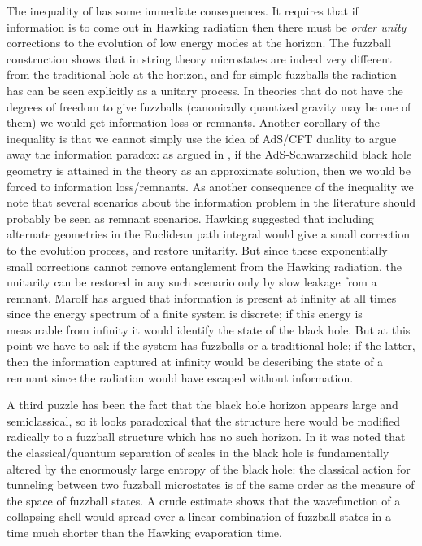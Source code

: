 \documentclass[12pt]{article}
\begin{document}
The inequality of \cite{mathurfuzz} has some immediate consequences. It requires that if information is to come out in Hawking radiation then there must be {\it order unity} corrections to the evolution of low energy modes at the horizon. The fuzzball construction shows that in string theory microstates are indeed very different from the traditional hole at the horizon, and for simple fuzzballs the radiation has can be seen explicitly as a unitary process. In theories that do not have the degrees of freedom to give fuzzballs (canonically quantized gravity may be one of them) we would get information loss or remnants. Another corollary of the inequality is that we cannot simply use the idea of AdS/CFT duality to argue away the information paradox: as argued in  \cite{mathurfuzz,mathurrecent}, if the AdS-Schwarzschild black hole geometry is attained in the theory as an approximate solution, then we would be forced to information loss/remnants. As another consequence of the inequality we note that several scenarios about the information problem in the literature should probably be seen as remnant scenarios. Hawking \cite{hawkingreverse} suggested that including alternate geometries in the Euclidean path integral would give a small correction to the evolution process, and restore unitarity. But since these exponentially small corrections cannot remove entanglement from the Hawking radiation, the unitarity can be restored in any such scenario only by slow leakage from a remnant. Marolf \cite{marolf} has argued that information is present at infinity at all times since the energy spectrum of a finite system is discrete; if  this energy is measurable from infinity it would identify the state of the black hole. But at this point we have to ask if the system has fuzzballs or a  traditional hole; if the latter,  then the information captured at infinity would be describing the state of a remnant since the radiation would have escaped without information. 


A third puzzle has been the fact that the black hole horizon appears large and semiclassical, so it looks paradoxical that the structure here would be modified radically to a fuzzball structure which has no such horizon. In \cite{tunnel} it was noted that the classical/quantum separation of scales in the black hole is fundamentally altered by  the enormously large entropy of the black hole: the classical action for tunneling between two fuzzball microstates is of the same order as the measure of the space of fuzzball states. A crude estimate \cite{time} shows that the wavefunction of a  collapsing shell would spread over a linear combination of fuzzball states in a time much shorter than the Hawking evaporation time. 
\end{document}
